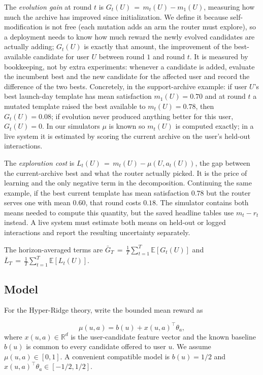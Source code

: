 \documentclass{article} %
\providecommand{\E}{\mathbb{E}}
\begin{document}
The \emph{evolution gain} at round $t$ is $G_t(U) \,=\, m_t(U) - m_1(U)$, measuring how much the archive has improved since initialization. We define it because self-modification is not free (each mutation adds an arm the router must explore), so a deployment needs to know how much reward the newly evolved candidates are actually adding; $G_t(U)$ is exactly that amount, the improvement of the best-available candidate for user $U$ between round $1$ and round $t$. It is measured by bookkeeping, not by extra experiments: whenever a candidate is added, evaluate the incumbent best and the new candidate for the affected user and record the difference of the two bests. Concretely, in the support-archive example: if user $U$'s best launch-day template has mean satisfaction $m_1(U) = 0.70$ and at round $t$ a mutated template raised the best available to $m_t(U) = 0.78$, then $G_t(U) = 0.08$; if evolution never produced anything better for this user, $G_t(U) = 0$. In our simulators $\mu$ is known so $m_t(U)$ is computed exactly; in a live system it is estimated by scoring the current archive on the user's held-out interactions.

The \emph{exploration cost} is $L_t(U) \,=\, m_t(U) - \mu(U, a_t(U))$, the gap between the current-archive best and what the router actually picked. It is the price of learning and the only negative term in the decomposition. Continuing the same example, if the best current template has mean satisfaction $0.78$ but the router serves one with mean $0.60$, that round costs $0.18$. The simulator contains both means needed to compute this quantity, but the saved headline tables use \(m_t-r_t\) instead. A live system must estimate both means on held-out or logged interactions and report the resulting uncertainty separately.


The horizon-averaged terms are $\bar G_T \,=\, \frac{1}{T}\sum_{t=1}^T \E[G_t(U)]$ and $\bar L_T \,=\, \frac{1}{T}\sum_{t=1}^T \E[L_t(U)]$.

\subsection{Model}
\label{sec:method-model}

For the Hyper-Ridge theory, write the bounded mean reward as

\begin{equation}
\mu(u,a)=b(u)+x(u,a)^\top\theta_a ,
\end{equation}
where $x(u,a)\in\mathbb{R}^d$ is the user-candidate feature vector and the known baseline $b(u)$ is common to every candidate offered to user $u$. We assume $\mu(u,a)\in[0,1]$. A convenient compatible model is $b(u)=1/2$ and $x(u,a)^\top\theta_a\in[-1/2,1/2]$.
\end{document}
